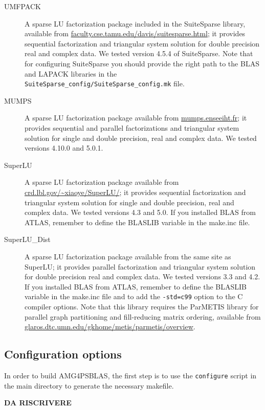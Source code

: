 \begin{description}
\item[UMFPACK] \cite{UMFPACK}
  A sparse LU factorization package included in the SuiteSparse library, available from
  \url{faculty.cse.tamu.edu/davis/suitesparse.html};
  it provides sequential factorization and triangular system solution for double
  precision real and complex data. We tested version 4.5.4 of SuiteSparse.
  Note that for configuring SuiteSparse you should provide the right path to the BLAS
  and LAPACK libraries in the \verb|SuiteSparse_config/SuiteSparse_config.mk| file.
\item[MUMPS] \cite{MUMPS}
  A sparse LU factorization package available from \url{mumps.enseeiht.fr};
  it provides sequential and parallel factorizations and triangular system solution
  for single and double precision, real and complex data.
  We tested versions 4.10.0 and 5.0.1.
\item[SuperLU] \cite{SUPERLU}
  A sparse LU factorization package available from
  \url{crd.lbl.gov/~xiaoye/SuperLU/}; it provides sequential
  factorization and triangular system solution for single and double precision,
  real and complex data. We tested versions 4.3 and 5.0. If you installed BLAS from
  ATLAS, remember to define the BLASLIB variable in the make.inc file.
 \item[SuperLU\_Dist] \cite{SUPERLUDIST}
   A sparse LU factorization package available
   from the same site as SuperLU; it provides parallel factorization and
   triangular system solution for double precision real and complex data.
   We tested versions 3.3 and 4.2. If you installed BLAS from
   ATLAS, remember to define the BLASLIB variable in the make.inc file and
   to add the \verb|-std=c99| option to the C compiler options.
   Note that this library requires the ParMETIS
   library for parallel graph partitioning and fill-reducing matrix ordering, available from
   \url{glaros.dtc.umn.edu/gkhome/metis/parmetis/overview}.
\end{description}

\subsection{Configuration options}

In order to build AMG4PSBLAS, the first step is to use the \verb|configure| script
in the main directory to generate the necessary makefile.


\bf{DA RISCRIVERE}

